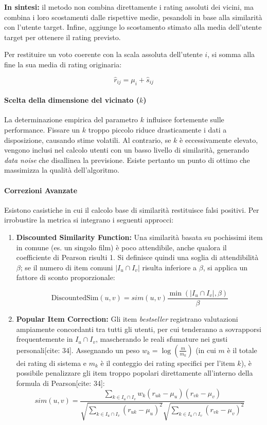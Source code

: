 \textbf{In sintesi:} il metodo non combina direttamente i rating assoluti dei vicini, ma combina i loro scostamenti dalle rispettive medie, pesandoli in base alla similarità con l'utente target. Infine, aggiunge lo scostamento stimato alla media dell'utente target per ottenere il rating previsto.



Per restituire un voto coerente con la scala assoluta dell'utente $i$, si somma alla fine la sua media di rating originaria:


$$\hat{r}_{ij} = \mu_i + \hat{s}_{ij}$$

\paragraph{Scelta della dimensione del vicinato ($k$)}
La determinazione empirica del parametro $k$ influisce fortemente sulle performance. Fissare un $k$ troppo piccolo riduce drasticamente i dati a disposizione, causando stime volatili. Al contrario, se $k$ è eccessivamente elevato, vengono inclusi nel calcolo utenti con un basso livello di similarità, generando \textit{data noise} che disallinea la previsione. Esiste pertanto un punto di ottimo che massimizza la qualità dell'algoritmo.

\paragraph{Correzioni Avanzate}
Esistono casistiche in cui il calcolo base di similarità restituisce falsi positivi. Per irrobustire la metrica si integrano i seguenti approcci:
\begin{enumerate}
\item \textbf{Discounted Similarity Function:} Una similarità basata su pochissimi item in comune (es. un singolo film) è poco attendibile, anche qualora il coefficiente di Pearson risulti 1. Si definisce quindi una soglia di attendibilità $\beta$; se il numero di item comuni $\vert{}I_u \cap I_v\vert{}$ risulta inferiore a $\beta$, si applica un fattore di sconto proporzionale:


$$\text{DiscountedSim}(u,v) = sim(u,v) \frac{\min(\vert{}I_u \cap I_v\vert{}, \beta)}{\beta}$$


\item \textbf{Popular Item Correction:} Gli item \textit{bestseller} registrano valutazioni ampiamente concordanti tra tutti gli utenti, per cui tenderanno a sovrapporsi frequentemente in $I_u \cap I_v$, mascherando le reali sfumature nei gusti personali[cite: 34]. Assegnando un peso $w_k = \log \left(\frac{m}{m_k}\right)$ (in cui $m$ è il totale dei rating di sistema e $m_k$ è il conteggio dei rating specifici per l'item $k$), è possibile penalizzare gli item troppo popolari direttamente all'interno della formula di Pearson[cite: 34]:
\[sim(u,v) = \frac{\sum_{k \in I_u \cap I_v} w_k (r_{uk} - \mu_u)(r_{vk} - \mu_v)}{\sqrt{\sum_{k \in I_u \cap I_v} (r_{uk} - \mu_u)^2} \sqrt{\sum_{k \in I_u \cap I_v} (r_{vk} - \mu_v)^2}}\]



\end{enumerate}

